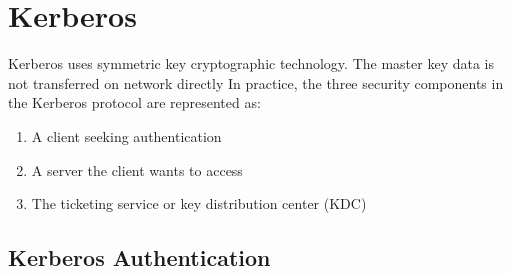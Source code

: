 \section{Kerberos}
Kerberos uses symmetric key cryptographic technology.
The master key data is not transferred on network directly
In practice, the three security components in the Kerberos protocol are represented as:
\begin{enumerate}
  \item A client seeking authentication
  \item A server the client wants to access
  \item The ticketing service or key distribution center (KDC)
\end{enumerate}


\subsection{Kerberos Authentication}

